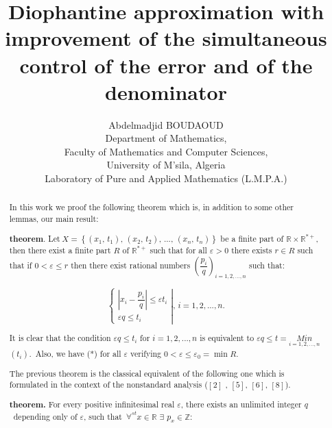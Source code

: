 \documentclass[12pt]{article}
\begin{document}
\title{Diophantine approximation with improvement of the simultaneous
control of the error and of the denominator }
\author{Abdelmadjid BOUDAOUD \\
Department of Mathematics, \\
Faculty of Mathematics and Computer Sciences, \\
University of M'sila, Algeria\\
Laboratory of Pure and Applied Mathematics (L.M.P.A.)}
\maketitle

\begin{abstract}
In this work we proof the following theorem which is, in addition to some
other lemmas, our main result:

\noindent \textbf{theorem}. Let$\ X=\left\{ \left( x_{1}\text{, }%
t_{1}\right) \text{, }\left( x_{2}\text{, }t_{2}\right) \text{, ..., }\left(
x_{n}\text{, }t_{n}\right) \right\} $ be a finite part of $\mathbb{R}\times 
\mathbb{R}^{\ast +}$, then there exist a finite part $R$ of $\mathbb{R}%
^{\ast +}$ such that for all $\varepsilon >0$ there exists $r\in R$ such
that if $0<\varepsilon \leq r$ then there exist rational numbers $\left( 
\dfrac{p_{i}}{q}\right) _{i=1,2,...,n}$ such that:

\begin{equation}
\left\{ 
\begin{array}{c}
\left\vert x_{i}-\dfrac{p_{i}}{q}\right\vert \leq \varepsilon t_{i} \\ 
\varepsilon q\leq t_{i}%
\end{array}%
\right\vert \text{, }i=1,2,...,n\text{.}  \tag{*}
\end{equation}

\noindent It is clear that the condition $\varepsilon q\leq t_{i}$ for $%
i=1,2,...,n$ is equivalent to $\varepsilon q\leq t=\underset{i=1,2,...,n}{Min%
}$ $\left( t_{i}\right) $.\ Also, we have (*) for all $\varepsilon $
verifying $0<\varepsilon \leq \varepsilon _{0}=\min R$.

The previous theorem is the classical equivalent of the following one which
is formulated in the context of the nonstandard analysis ($\left[ 2\right] $%
, $\left[ 5\right] $, $\left[ 6\right] $, $\left[ 8\right] $).

\noindent \textbf{theorem. }For every positive infinitesimal real $%
\varepsilon $, there exists an unlimited integer $q$\ depending only of $%
\varepsilon $, such that\textit{\ }$\forall ^{st}x\in \mathbb{R}$ $\exists $ 
$p_{x}\in \mathbb{Z}$:


\end{abstract}
\end{document}

